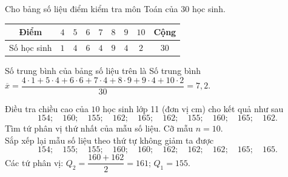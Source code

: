 \begin{bt}%
	Cho bảng số liệu điểm kiểm tra môn Toán của $30$ học sinh.
	\begin{center}
		\begin{tabular}{|c|c|c|c|c|c|c|c|c|}
			\hline Điểm & $4$ & $5$ & $6$ & $7$ & $8$ & $9$ & $10$ & Cộng \\
			\hline Số học sinh & $1$ & $4$ & $6$ & $4$ & $9$ & $4$ & $2$ & $30$ \\
			\hline
		\end{tabular}
	\end{center}
	Số trung bình của bảng số liệu trên là
	\loigiai
	{
		Số trung bình $\overline{x}=\dfrac{4\cdot1+5\cdot4+6\cdot6+7\cdot4+8\cdot9+9\cdot4+10\cdot2}{30}=7{,}2$.
	}
\end{bt}

\begin{bt}%
	Điều tra chiều cao của $10$ học sinh lớp 11 (đơn vị cm) cho kết quả như sau
	\[154 ;\quad 160 ;\quad 155 ;\quad 162 ;\quad 165 ;\quad 162 ;\quad 155 ;\quad 160 ;\quad 165 ;\quad 162 .\]
	Tìm tứ phân vị thứ nhất của mẫu số liệu.
	\loigiai
	{
		    Cỡ mẫu $n=10$. \\
			Sắp xếp lại mẫu số liệu theo thứ tự không giảm ta được
			$$
			154;\quad155;\quad155;\quad160;\quad160;\quad162;\quad162;\quad162;\quad165;\quad165.
			$$
			Các tứ phân vị: $Q_2=\dfrac{160+162}{2}=161$; $Q_1=155$.
			}
\end{bt}

